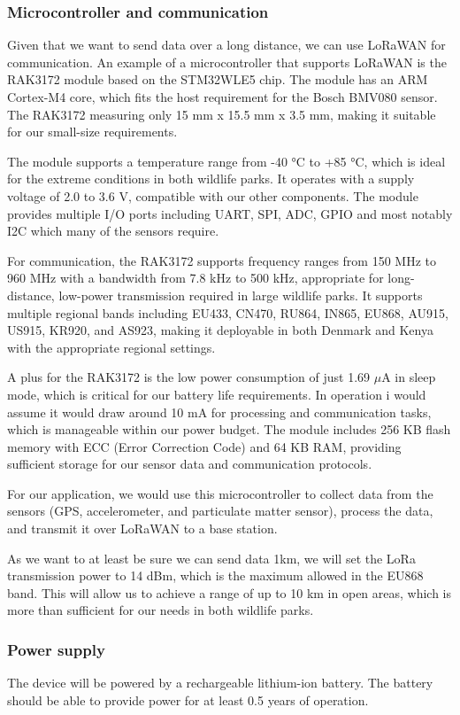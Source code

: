 \subsubsection{Microcontroller and communication}
Given that we want to send data over a long distance, we can use LoRaWAN for communication. An example of a microcontroller that supports LoRaWAN is the RAK3172 module based on the STM32WLE5 chip\cite{rak3172_datasheet}. The module has an ARM Cortex-M4 core, which fits the host requirement for the Bosch BMV080 sensor. The RAK3172 measuring only 15 mm x 15.5 mm x 3.5 mm, making it suitable for our small-size requirements.

The module supports a temperature range from -40 °C to +85 °C, which is ideal for the extreme conditions in both wildlife parks. It operates with a supply voltage of 2.0 to 3.6 V, compatible with our other components. The module provides multiple I/O ports including UART, SPI, ADC, GPIO and most notably I2C which many of the sensors require.

For communication, the RAK3172 supports frequency ranges from 150 MHz to 960 MHz with a bandwidth from 7.8 kHz to 500 kHz, appropriate for long-distance, low-power transmission required in large wildlife parks. It supports multiple regional bands including EU433, CN470, RU864, IN865, EU868, AU915, US915, KR920, and AS923, making it deployable in both Denmark and Kenya with the appropriate regional settings.

A plus for the RAK3172 is the low power consumption of just 1.69 $\mu$A in sleep mode, which is critical for our battery life requirements. In operation i would assume it would draw around 10 mA for processing and communication tasks, which is manageable within our power budget. The module includes 256 KB flash memory with ECC (Error Correction Code) and 64 KB RAM, providing sufficient storage for our sensor data and communication protocols.

For our application, we would use this microcontroller to collect data from the sensors (GPS, accelerometer, and particulate matter sensor), process the data, and transmit it over LoRaWAN to a base station.

As we want to at least be sure we can send data 1km, we will set the LoRa transmission power to 14 dBm, which is the maximum allowed in the EU868 band. This will allow us to achieve a range of up to 10 km in open areas, which is more than sufficient for our needs in both wildlife parks.

\subsubsection{Power supply}
The device will be powered by a rechargeable lithium-ion battery. The battery should be able to provide power for at least 0.5 years of operation.

